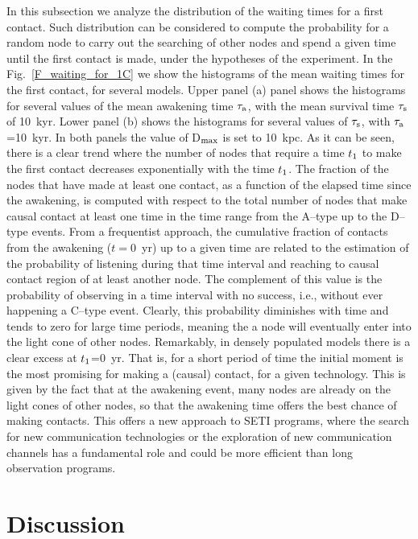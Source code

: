 \documentclass[crop]{CSLB}
\newcommand{\ceti}{node}
\newcommand{\cetis}{nodes}
\begin{document}
In this subsection we analyze the distribution of the waiting times
for a first contact.
%
Such distribution can be considered to compute the probability for a
random \ceti{} to carry out the searching of other nodes and spend a
given time until the first contact is made, under the hypotheses of
the experiment.
%
In the Fig.~\ref{F_waiting_for_1C} we show the histograms of the mean
waiting times for the first contact, for several models.
%
Upper panel (a) panel shows the histograms for several values of the
mean awakening time $\tau_{\rm a}$, with the mean survival time
$\tau_{\rm s}$ of 10~kyr.
%
Lower panel (b) shows the histograms for several values of $\tau_{\rm
s}$, with $\tau_{\rm a}$=10~kyr.
%
In both panels the value of D$_{\rm max}$ is set to 10~kpc.
%
As it can be seen, there is a clear trend where the number of nodes
that require a time $t_{\rm 1}$ to make the first contact decreases
exponentially with the time $t_{\rm 1}$.
%
The fraction of the \cetis{} that have made at least one contact, as a
function of the elapsed time since the awakening, is computed with
respect to the total number of nodes that make causal contact at least
one time in the time range from the A--type up to the D--type events.
%
From a frequentist approach, the cumulative fraction of contacts from
the awakening ($t=$0~yr) up to a given time are related to the
estimation of the probability of listening during that time interval
and reaching to causal contact region of at least another node.
%
The complement of this value is the probability of observing in a time
interval with no success, i.e., without ever happening a C--type
event.
%
Clearly, this probability diminishes with time and tends to zero for
large time periods, meaning the a \ceti{} will eventually enter into
the light cone of other \cetis{}.
%
Remarkably, in densely populated models there is a clear excess at
$t_{\rm 1}$=0~yr.
%
That is, for a short period of time the initial moment is the most
promising for making a (causal) contact, for a given technology.
%
This is given by the fact that at the awakening event, many nodes are
already on the light cones of other nodes, so that the awakening time
offers the best chance of making contacts.
%
This offers a new approach to SETI programs, where the search for new
communication technologies or the exploration of new communication
channels has a fundamental role and could be more efficient than long
observation programs.




\section{Discussion}\label{S_discussion}
\end{document}
